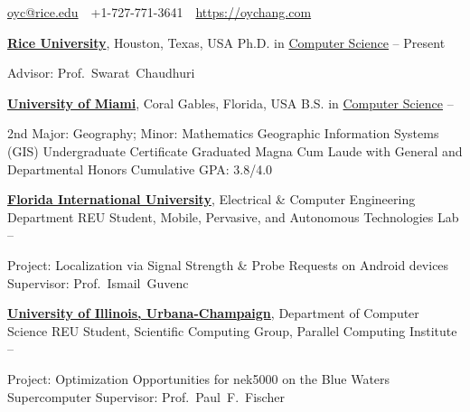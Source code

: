 \documentclass[letterpaper,MMMyyyy,nonstopmode]{simpleresumecv}
\newcommand{\CVAuthor}{Oliver Chang}
\newcommand{\CVWebpage}{https://oychang.com}
\begin{document}

\Title{\CVAuthor}

\begin{SubTitle}
\href{mailto:oyc@rice.edu}{oyc@rice.edu}
\,\SubBulletSymbol\,
+1-727-771-3641
\,\SubBulletSymbol\,
\href{\CVWebpage}
{\url{\CVWebpage}}
\end{SubTitle}

\begin{Body}



\Entry
\href{http://www.rice.edu/}{\textbf{Rice University}},
Houston, Texas, USA
\Gap
\BulletItem
Ph.D. in \href{http://www.cs.rice.edu/}{Computer Science}
\hfill
{} -- Present
\begin{Detail}
\SubBulletItem Advisor: Prof.~Swarat~Chaudhuri
\end{Detail}

\BigGap

\Entry
\href{http://welcome.miami.edu/}{\textbf{University of Miami}},
Coral Gables, Florida, USA
\Gap
\BulletItem
B.S. in \href{http://www.as.miami.edu/csc/}{Computer Science}
\hfill
{} -- 
\begin{Detail}
\SubBulletItem 2nd Major: Geography; Minor: Mathematics
\SubBulletItem Geographic Information Systems (GIS) Undergraduate Certificate
\SubBulletItem Graduated Magna Cum Laude with General and Departmental Honors
\SubBulletItem Cumulative GPA: 3.8/4.0
\end{Detail}



\Entry
\href{http://www.fiu.edu/}{\textbf{Florida International University}}, Electrical \& Computer Engineering Department
\Gap
\BulletItem REU Student, Mobile, Pervasive, and Autonomous Technologies Lab
\hfill {} -- 
\begin{Detail}
\SubBulletItem
Project: Localization via Signal Strength \& Probe Requests on Android devices
\SubBulletItem
Supervisor: Prof.~Ismail~Guvenc
\end{Detail}

\Entry
\href{http://illinois.edu/}{\textbf{University of Illinois, Urbana-Champaign}}, Department of Computer Science
\Gap
\BulletItem REU Student, Scientific Computing Group, Parallel Computing Institute
\hfill {} -- 
\begin{Detail}
\SubBulletItem
Project: Optimization Opportunities for nek5000 on the Blue Waters Supercomputer
\SubBulletItem
Supervisor: Prof.~Paul~F.~Fischer
\end{Detail}


\end{Body}
\end{document}
